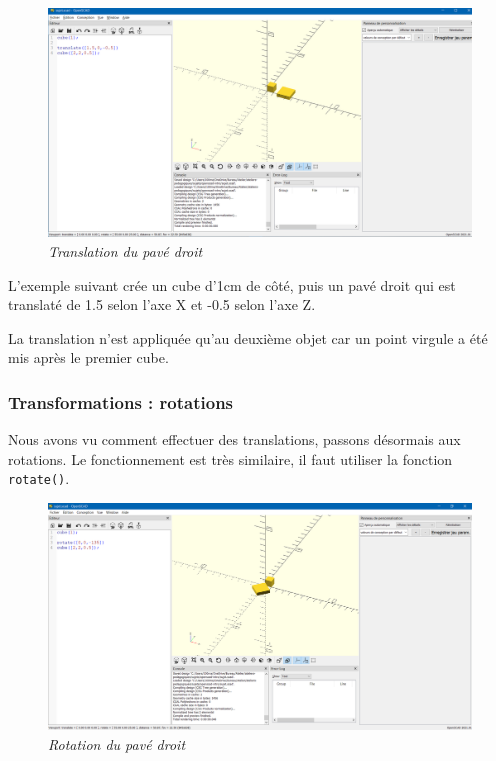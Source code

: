 \begin{figure}[ht]
	\centering
	\includegraphics[width=12cm]{images/translate}
	\caption{\textit{Translation du pavé droit}}
\end{figure}

L'exemple suivant crée un cube d'1cm de côté, puis un pavé droit qui est translaté de 1.5 selon l'axe X et -0.5 selon l'axe Z.

La translation n'est appliquée qu'au deuxième objet car un point virgule a été mis après le premier cube.


\subsubsection{Transformations : rotations}

Nous avons vu comment effectuer des translations, passons désormais aux rotations.
Le fonctionnement est très similaire, il faut utiliser la fonction \verb|rotate()|.

\vspace{12pt}

\begin{figure}[ht]
	\centering
	\includegraphics[width=12cm]{images/rotate}
	\caption{\textit{Rotation du pavé droit}}
\end{figure}

